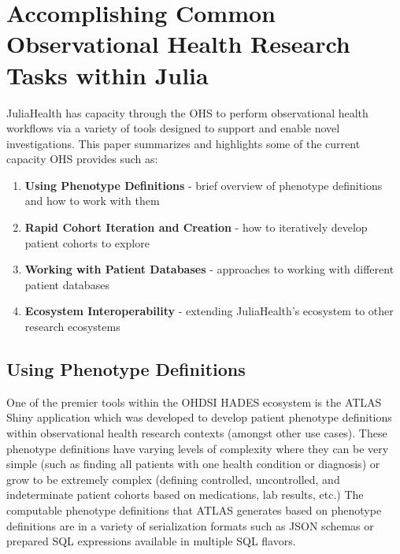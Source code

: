 \documentclass{juliacon}
\begin{document}
\section{Accomplishing Common Observational Health Research Tasks within Julia}

JuliaHealth has capacity through the OHS to perform observational health workflows via a variety of tools designed to support and enable novel investigations.
This paper summarizes and highlights some of the current capacity OHS provides such as:

\begin{enumerate}
\item \textbf{Using Phenotype Definitions} - brief overview of phenotype definitions and how to work with them
\item \textbf{Rapid Cohort Iteration and Creation} - how to iteratively develop patient cohorts to explore
\item \textbf{Working with Patient Databases} - approaches to working with different patient databases
\item \textbf{Ecosystem Interoperability} - extending JuliaHealth's ecosystem to other research ecosystems
\end{enumerate}

\subsection{Using Phenotype Definitions}


One of the premier tools within the OHDSI HADES ecosystem is the ATLAS Shiny application which was developed to develop patient phenotype definitions within observational health research contexts (amongst other use cases).
These phenotype definitions have varying levels of complexity where they can be very simple (such as finding all patients with one health condition or diagnosis) or grow to be extremely complex (defining controlled, uncontrolled, and indeterminate patient cohorts based on medications, lab results, etc.)
The computable phenotype definitions that ATLAS generates based on phenotype definitions are in a variety of serialization formats such as JSON schemas or prepared SQL expressions available in multiple SQL flavors.\footnotemark
\end{document}
